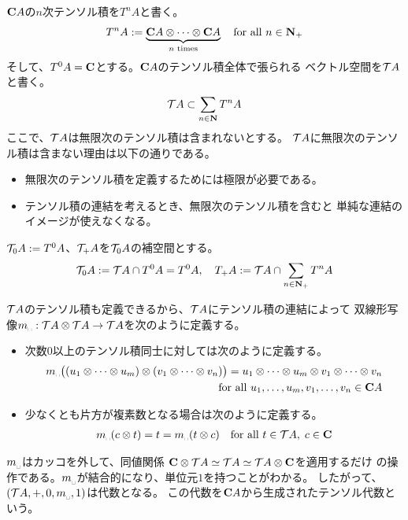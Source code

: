 	$\mathbf{C} A$の$n$次テンソル積を$T^nA$と書く。
	\begin{equation*}\begin{split}
		T^nA := \underbrace{\mathbf{C} A\otimes\cdots\otimes \mathbf{C} A}_{
			n\text{ times}} \quad\text{for all }n\in\mathbf{N}_+
	\end{split}\end{equation*}
	そして、$T^0A=\mathbf{C}$とする。$\mathbf{C} A$のテンソル積全体で張られる
	ベクトル空間を${{\mathcal{T}}} A$と書く。
	\begin{equation*}\begin{split}
		{\ensuremath{{\mathcal{T}}}} A \subset \sum_{n\in\mathbf{N}} T^nA
	\end{split}\end{equation*}
	ここで、${{\mathcal{T}}} A$は無限次のテンソル積は含まれないとする。
	${{\mathcal{T}}} A$に無限次のテンソル積は含まない理由は以下の通りである。
	\begin{itemize}\setlength{\itemsep}{-1mm} %
		\item 無限次のテンソル積を定義するためには極限が必要である。
		\item テンソル積の連結を考えるとき、無限次のテンソル積を含むと
		単純な連結のイメージが使えなくなる。
	\end{itemize} %
	${{\mathcal{T}}}_0A:=T^0A$、${{\mathcal{T}}}_+A$を${{\mathcal{T}}}_0A$の補空間とする。
	\begin{equation*}\begin{split}
		{\ensuremath{{\mathcal{T}}}}_0A := {{\mathcal{T}}} A\cap T^0A = T^0A
		,\quad T_+A := {{\mathcal{T}}} A\cap \sum_{n\in\mathbf{N}_+}T^nA
	\end{split}\end{equation*}

	${{\mathcal{T}}} A$のテンソル積も定義できるから、${{\mathcal{T}}} A$にテンソル積の連結によって
	双線形写像$m_\myspace:\T A\otimes \T A\to \T A$を次のように定義する。
	\begin{itemize}\setlength{\itemsep}{-1mm} %
		\item 次数$0$以上のテンソル積同士に対しては次のように定義する。
		\begin{equation*}\begin{split}
			m_\myspace\bigl((u_1\otimes\cdots\otimes u_m)
				\otimes(v_1\otimes\cdots\otimes v_n)\bigr)
			= u_1\otimes\cdots\otimes u_m\otimes v_1\otimes\cdots\otimes v_n \\
			\quad\text{for all } u_1,\dots, u_m, v_1,\dots, v_n\in \fukuso A
		\end{split}\end{equation*}
		\item 少なくとも片方が複素数となる場合は次のように定義する。
		\begin{equation*}\begin{split}
			m_\myspace(c\otimes t) = t = m_\myspace(t\otimes c)
			\quad\text{for all }t\in\T A,\; c\in \fukuso
		\end{split}\end{equation*}
	\end{itemize} %
	$m_\myspace$はカッコを外して、同値関係
	$\mathbf{C}\otimes {\ensuremath{{\mathcal{T}}}} A\simeq {\ensuremath{{\mathcal{T}}}} A\simeq {\ensuremath{{\mathcal{T}}}} A\otimes \mathbf{C}$を適用するだけ
	の操作である。$m_\myspace$が結合的になり、単位元$1$を持つことがわかる。
	したがって、$(\T A,+,0,m_\myspace,1)$は代数となる。
	この代数を$\mathbf{C} A$から生成されたテンソル代数という。

